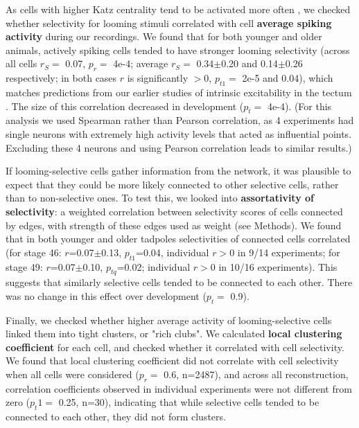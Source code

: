 \documentclass{article}
\begin{document}

As cells with higher Katz centrality tend to be activated more often \citep{fletcher2018katz}, we checked whether selectivity for looming stimuli correlated with cell \textbf{average spiking activity} during our recordings. We found that for both younger and older animals, actively spiking cells tended to have stronger looming selectivity (across all cells $r_S=$ 0.07, $p_r=$ 4e-4; average $r_S =$ 0.34$\pm$0.20 and 0.14$\pm$0.26 respectively; in both cases $r$ is significantly $>0$, $p_{t1}=$ 2e-5 and 0.04), which matches predictions from our earlier studies of intrinsic excitability in the tectum \citep{busch2019}. The size of this correlation decreased in development ($p_t=$ 4e-4). (For this analysis we used Spearman rather than Pearson correlation, as 4 experiments had single neurons with extremely high activity levels that acted as influential points. Excluding these 4 neurons and using Pearson correlation leads to similar results.) 

If looming-selective cells gather information from the network, it was plausible to expect that they could be more likely connected to other selective cells, rather than to non-selective ones. To test this, we looked into \textbf{assortativity of selectivity}: a weighted correlation between selectivity scores of cells connected by edges, with strength of these edges used as weight (see Methods). We found that in both younger and older tadpoles selectivities of connected cells correlated (for stage 46: $r$=0.07$\pm$0.13, $p_{t1}$=0.04, individual $r>$0 in 9/14 experiments; for stage 49: $r$=0.07$\pm$0.10, $p_{tq}$=0.02; individual $r>$0 in 10/16 experiments). This suggests that similarly selective cells tended to be connected to each other. There was no change in this effect over development ($p_t=$ 0.9).


Finally, we checked whether higher average activity of looming-selective cells linked them into tight clusters, or "rich clubs". We calculated \textbf{local clustering coefficient} for each cell, and checked whether it correlated with cell selectivity. We found that local clustering coefficient did not correlate with cell selectivity when all cells were considered ($p_r=$ 0.6, n=2487), and across all reconstruction, correlation coefficients observed in individual experiments were not different from zero ($p_t1=$ 0.25, n=30), indicating that while selective cells tended to be connected to each other, they did not form clusters.
\end{document}

